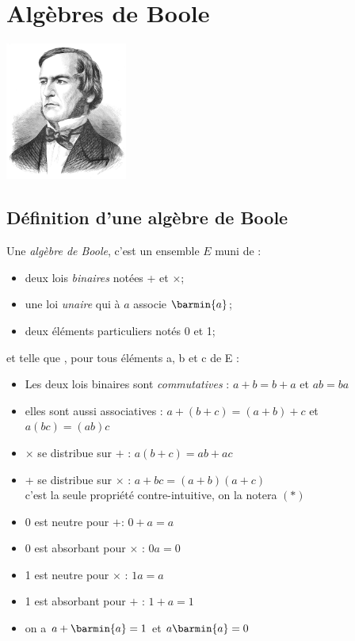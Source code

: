 
\chapter{Algèbres de Boole}
\begin{center}
    \includegraphics[width=4cm]{boole/img/boole.jpg}
\end{center}
\section{Définition d'une algèbre de Boole}

\begin{definition}[]
    Une \textit{algèbre de Boole}, c'est un ensemble $E$ muni de :
    \begin{itemize}
        \item 	deux lois \textit{binaires} notées + et $\times$;
        \item 	une loi \textit{unaire} qui à $a$ associe $\barmin{a}$;
        \item 	deux éléments particuliers notés 0 et 1;
    \end{itemize}
    et telle que , pour tous éléments a, b et c de E :
    \begin{itemize}
        \item 	Les deux lois binaires sont \textit{commutatives} :
              $a+b=b+a$ et $ab=ba$
        \item 	elles sont aussi associatives :
              $a+(b+c)=(a+b)+c$ et $a(bc)=(ab)c$
        \item 	$\times$ se distribue sur $+$ :
              $a(b+c)=ab+ac$
        \item 	+ se distribue sur $\times$ :
              $\boxed{a+bc=(a+b)(a+c)}$  \\[.5em]
              c'est la seule propriété contre-intuitive, on la notera $(*)$
        \item 	0 est neutre pour $+$: $0+a = a$
        \item 	0 est absorbant pour $\times$ : $0a=0$
        \item 	1 est neutre pour $\times$ : $1a=a$
        \item 	1 est absorbant pour $+$ : $1+a=1$
        \item 	on a $a+\barmin{a}=1$ et $a\barmin{a}=0$
    \end{itemize}
\end{definition}



